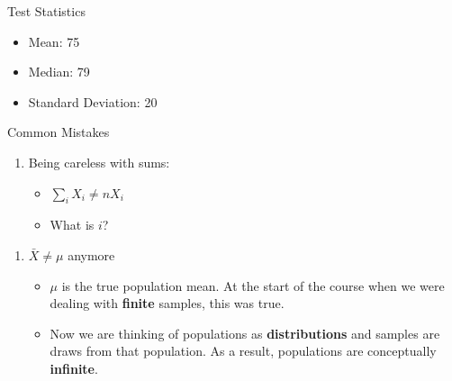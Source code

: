 \begin{frame}{Test Statistics}

\begin{itemize}
\tightlist
\item
  Mean: 75
\item
  Median: 79
\item
  Standard Deviation: 20
\end{itemize}

\end{frame}

\begin{frame}{Common Mistakes}

\begin{enumerate}[<+->]
\def\labelenumi{\arabic{enumi}.}
\tightlist
\item
  Being careless with sums:

  \begin{itemize}[<+->]
  \tightlist
  \item
    \(\sum_i X_i \neq nX_i\)
  \item
    What is \(i\)?
  \end{itemize}
\end{enumerate}

\begin{enumerate}[<+->]
\def\labelenumi{\arabic{enumi}.}
\setcounter{enumi}{1}
\tightlist
\item
  \(\bar{X} \neq \mu\) anymore

  \begin{itemize}[<+->]
  \tightlist
  \item
    \(\mu\) is the true population mean. At the start of the course when
    we were dealing with \textbf{finite} samples, this was true.
  \item
    Now we are thinking of populations as \textbf{distributions} and
    samples are draws from that population. As a result, populations are
    conceptually \textbf{infinite}.
  \end{itemize}
\end{enumerate}

\end{frame}

